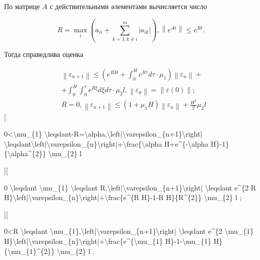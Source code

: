 \documentclass[10pt]{article}
\begin{document}
По матрице $A$ с действительными әлементами вычисляется число



\[

R=\max _{i}\left(a_{i i}+\sum_{k=1, k \neq i}^{m}\left|a_{i k}\right|\right),\left\|e^{A t}\right\| \leqslant e^{R t} .

\]



Тогда справедлива оценка



\[

\begin{aligned}

& \left\|\varepsilon_{n+1}\right\| \leqslant\left(e^{R H}+\int_{0}^{H} e^{R \tau} d \tau \cdot \mu_{1}\right)\left\|\varepsilon_{n}\right\|+ \\

& +\int_{0}^{H} \int_{0}^{\tau} e^{R \xi} d \xi d \tau \cdot \mu_{2} l,\left\|\varepsilon_{0}\right\|=\|\varepsilon(0)\| ; \\

& R=0,\left\|\varepsilon_{n+1}\right\| \leqslant\left(1+\mu_{1} H\right)\left\|\varepsilon_{n}\right\|+\frac{H^{2}}{2} \mu_{2} l

\end{aligned}

\][



0<\textbackslash mu\_\{1\} \textbackslash leqslant-R=\textbackslash alpha,\textbackslash left|\textbackslash varepsilon\_\{n+1\}\textbackslash right| \textbackslash leqslant\textbackslash left|\textbackslash varepsilon\_\{n\}\textbackslash right|+\textbackslash frac\{\textbackslash alpha H+e\^{}\{-\textbackslash alpha H\}-1\}\{\textbackslash alpha\^{}\{2\}\} \textbackslash mu\_\{2\} l



][



0 \textbackslash leqslant \textbackslash mu\_\{1\} \textbackslash leqslant R,\textbackslash left|\textbackslash varepsilon\_\{n+1\}\textbackslash right| \textbackslash leqslant e\^{}\{2 R H\}\textbackslash left|\textbackslash varepsilon\_\{n\}\textbackslash right|+\textbackslash frac\{e\^{}\{R H\}-1-R H\}\{R\^{}\{2\}\} \textbackslash mu\_\{2\} l ;



][



0<R \textbackslash leqslant \textbackslash mu\_\{1\},\textbackslash left|\textbackslash varepsilon\_\{n+1\}\textbackslash right| \textbackslash leqslant e\^{}\{2 \textbackslash mu\_\{1\} H\}\textbackslash left|\textbackslash varepsilon\_\{n\}\textbackslash right|+\textbackslash frac\{e\^{}\{\textbackslash mu\_\{1\} H\}-1-\textbackslash mu\_\{1\} H\}\{\textbackslash mu\_\{1\}\^{}\{2\}\} \textbackslash mu\_\{2\} l .
\end{document}
